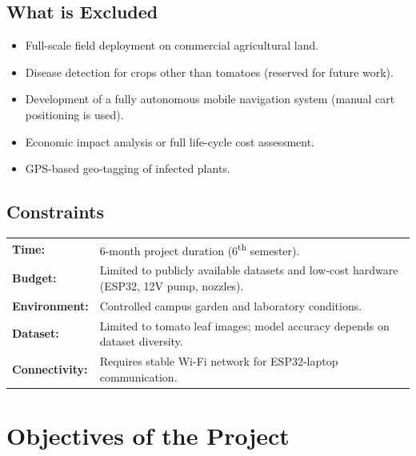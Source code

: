 \documentclass[12pt,a4paper,oneside]{report}
\begin{document}
\subsection{What is Excluded}

\begin{itemize}[leftmargin=2em]
    \item Full-scale field deployment on commercial agricultural land.
    \item Disease detection for crops other than tomatoes (reserved for future work).
    \item Development of a fully autonomous mobile navigation system (manual cart positioning is used).
    \item Economic impact analysis or full life-cycle cost assessment.
    \item GPS-based geo-tagging of infected plants.
\end{itemize}

\subsection{Constraints}

\begin{tabular}{p{3cm}p{10cm}}
\textbf{Time:} & 6-month project duration (6\textsuperscript{th} semester). \\
\textbf{Budget:} & Limited to publicly available datasets and low-cost hardware (ESP32, 12V pump, nozzles). \\
\textbf{Environment:} & Controlled campus garden and laboratory conditions. \\
\textbf{Dataset:} & Limited to tomato leaf images; model accuracy depends on dataset diversity. \\
\textbf{Connectivity:} & Requires stable Wi-Fi network for ESP32-laptop communication. \\
\end{tabular}

\section{Objectives of the Project}
\end{document}
